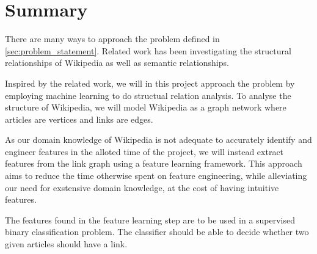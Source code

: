 \section{Summary}
There are many ways to approach the problem defined in \cref{sec:problem_statement}. Related work has been investigating the structural relationships of Wikipedia as well as semantic relationships.

Inspired by the related work, we will in this project approach the problem by employing machine learning to do structual relation analysis. To analyse the structure of Wikipedia, we will model Wikipedia as a graph network where articles are vertices and links are edges.

As our domain knowledge of Wikipedia is not adequate to accurately identify and engineer features in the alloted time of the project, we will instead extract features from the link graph using a feature learning framework. This approach aims to reduce the time otherwise spent on feature engineering, while alleviating our need for exstensive domain knowledge, at the cost of having intuitive features.

The features found in the feature learning step are to be used in a supervised binary classification problem. The classifier should be able to decide whether two given articles should have a link.










